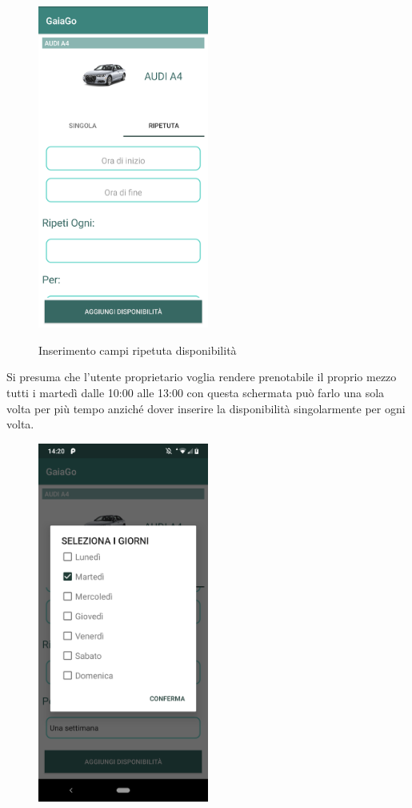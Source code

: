 \begin{itemize}
\begin{figure}[H]
		\includegraphics[width=0.5\textwidth]{res/images/aggiungi_disponibilita3.png}\\
		\caption{Inserimento campi ripetuta disponibilità}
		\label{campi disponibilità2}
	\end{figure}
	\pagebreak
	Si presuma che l'utente proprietario voglia rendere prenotabile il proprio mezzo tutti i martedì dalle 10:00 alle 13:00 con questa schermata può farlo una sola volta per più tempo anziché dover inserire la disponibilità singolarmente per ogni volta.
	\begin{figure}[H] 
		\centering 
		\includegraphics[width=0.5\textwidth]{res/images/aggiungi_disponibilita4.png}\\

\end{figure}
\end{itemize}
